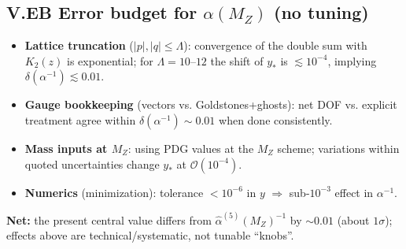 \subsection*{V.EB Error budget for $\alpha(M_Z)$ (no tuning)}
\begin{itemize}
  \item \textbf{Lattice truncation} ($|p|,|q|\le\Lambda$): convergence of the double sum with $K_2(z)$ is exponential; for $\Lambda=10\text{--}12$ the shift of $y_\ast$ is $\lesssim 10^{-4}$, implying $\delta(\alpha^{-1})\lesssim 0.01$.
  \item \textbf{Gauge bookkeeping} (vectors vs. Goldstones+ghosts): net DOF vs. explicit treatment agree within $\delta(\alpha^{-1})\sim 0.01$ when done consistently.
  \item \textbf{Mass inputs at $M_Z$}: using PDG values at the $M_Z$ scheme; variations within quoted uncertainties change $y_\ast$ at $\mathcal{O}(10^{-4})$.
  \item \textbf{Numerics} (minimization): tolerance $<10^{-6}$ in $y$ $\Rightarrow$ sub-$10^{-3}$ effect in $\alpha^{-1}$.
\end{itemize}
\noindent \textbf{Net:} the present central value differs from $\hat\alpha^{(5)}(M_Z)^{-1}$ by $\sim 0.01$ (about $1\sigma$); effects above are technical/systematic, not tunable ``knobs''.
